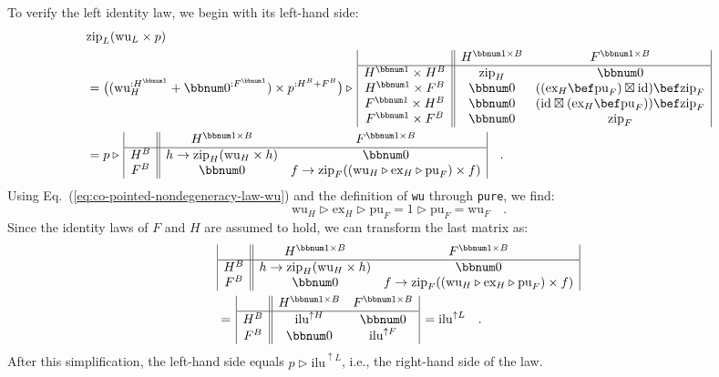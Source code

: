To verify the left identity law, we begin with its left-hand side:
\begin{align*}
 & \text{zip}_{L}(\text{wu}_{L}\times p)\\
 & =\big((\text{wu}_{H}^{:H^{\bbnum 1}}+\bbnum 0^{:F^{\bbnum 1}})\times p^{:H^{B}+F^{B}}\big)\triangleright\,\begin{array}{|c||cc|}
 & H^{\bbnum 1\times B} & F^{\bbnum 1\times B}\\
\hline H^{\bbnum 1}\times H^{B} & \text{zip}_{H} & \bbnum 0\\
H^{\bbnum 1}\times F^{B} & \bbnum 0 & ((\text{ex}_{H}\bef\text{pu}_{F})\boxtimes\text{id})\bef\text{zip}_{F}\\
F^{\bbnum 1}\times H^{B} & \bbnum 0 & (\text{id}\boxtimes(\text{ex}_{H}\bef\text{pu}_{F}))\bef\text{zip}_{F}\\
F^{\bbnum 1}\times F^{B} & \bbnum 0 & \text{zip}_{F}
\end{array}\\
 & =p\triangleright\,\begin{array}{|c||cc|}
 & H^{\bbnum 1\times B} & F^{\bbnum 1\times B}\\
\hline H^{B} & h\rightarrow\text{zip}_{H}(\text{wu}_{H}\times h) & \bbnum 0\\
F^{B} & \bbnum 0 & f\rightarrow\text{zip}_{F}((\text{wu}_{H}\triangleright\text{ex}_{H}\triangleright\text{pu}_{F})\times f)
\end{array}\quad.
\end{align*}
Using Eq.~(\ref{eq:co-pointed-nondegeneracy-law-wu}) and the definition
of \lstinline!wu! through \lstinline!pure!, we find:
\[
\text{wu}_{H}\triangleright\text{ex}_{H}\triangleright\text{pu}_{F}=1\triangleright\text{pu}_{F}=\text{wu}_{F}\quad.
\]
Since the identity laws of $F$ and $H$ are assumed to hold, we can
transform the last matrix as:
\begin{align*}
 & \begin{array}{|c||cc|}
 & H^{\bbnum 1\times B} & F^{\bbnum 1\times B}\\
\hline H^{B} & h\rightarrow\text{zip}_{H}(\text{wu}_{H}\times h) & \bbnum 0\\
F^{B} & \bbnum 0 & f\rightarrow\text{zip}_{F}((\text{wu}_{H}\triangleright\text{ex}_{H}\triangleright\text{pu}_{F})\times f)
\end{array}\\
 & =\,\begin{array}{|c||cc|}
 & H^{\bbnum 1\times B} & F^{\bbnum 1\times B}\\
\hline H^{B} & \text{ilu}^{\uparrow H} & \bbnum 0\\
F^{B} & \bbnum 0 & \text{ilu}^{\uparrow F}
\end{array}\,=\text{ilu}^{\uparrow L}\quad.
\end{align*}
After this simplification, the left-hand side equals $p\triangleright\text{ilu}^{\uparrow L}$,
i.e., the right-hand side of the law.

